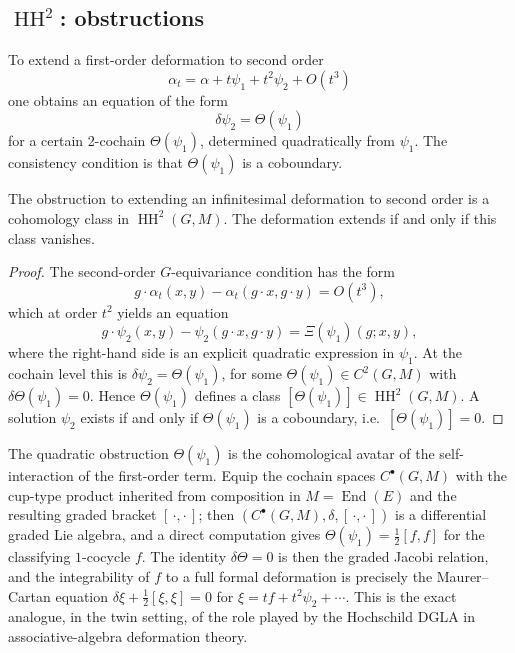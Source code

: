 \documentclass[11pt,a4paper]{article}
\numberwithin{equation}{section}
\DeclareMathOperator{\End}{End}
\DeclareMathOperator{\HH}{HH}
\newcommand{\Cochain}{C}
\newcommand{\diff}{\delta}
\begin{document}
	\subsection{$\HH^2$: obstructions}
	
	To extend a first-order deformation to second order
	\[
	\alpha_t=\alpha + t\psi_1 + t^2\psi_2 + O(t^3)
	\]
	one obtains an equation of the form
	\[
	\diff\psi_2 = \Theta(\psi_1)
	\]
	for a certain 2-cochain $\Theta(\psi_1)$, determined quadratically from $\psi_1$.
	The consistency condition is that $\Theta(\psi_1)$ is a coboundary.
	
	\begin{theorem}\label{thm:HH2-obstruction}
		The obstruction to extending an infinitesimal deformation to second order
		is a cohomology class in $\HH^2(G,M)$. The deformation extends
		if and only if this class vanishes.
	\end{theorem}
	
	\begin{proof}
		The second-order $G$-equivariance condition has the form
		\[
		g\cdot \alpha_t(x,y) - \alpha_t(g\cdot x,g\cdot y) = O(t^3),
		\]
		which at order $t^2$ yields an equation
		\[
		g\cdot \psi_2(x,y) - \psi_2(g\cdot x,g\cdot y) = \Xi(\psi_1)(g;x,y),
		\]
		where the right-hand side is an explicit quadratic expression in $\psi_1$.
		At the cochain level this is $\diff \psi_2 = \Theta(\psi_1)$, for some
		$\Theta(\psi_1)\in \Cochain^2(G,M)$ with $\diff\Theta(\psi_1)=0$.
		Hence $\Theta(\psi_1)$ defines a class $[\Theta(\psi_1)]\in \HH^2(G,M)$.
		A solution $\psi_2$ exists if and only if $\Theta(\psi_1)$ is a coboundary,
		i.e.\ $[\Theta(\psi_1)]=0$.
	\end{proof}
	
	\begin{remark}\label{rem:MC}
		The quadratic obstruction $\Theta(\psi_1)$ is the cohomological avatar of the self-interaction
		of the first-order term. Equip the cochain spaces $\Cochain^\bullet(G,M)$ with the cup-type product
		inherited from composition in $M=\End(E)$ and the resulting graded bracket $[\,\cdot,\cdot\,]$;
		then $(\Cochain^\bullet(G,M),\diff,[\,\cdot,\cdot\,])$ is a differential graded Lie algebra, and a
		direct computation gives $\Theta(\psi_1)=\tfrac12[f,f]$ for the classifying $1$-cocycle $f$. The
		identity $\diff\Theta=0$ is then the graded Jacobi relation, and the integrability of $f$ to a full
		formal deformation is precisely the Maurer--Cartan equation
		$\diff\xi+\tfrac12[\xi,\xi]=0$ for $\xi=tf+t^2\psi_2+\cdots$. This is the exact analogue, in the
		twin setting, of the role played by the Hochschild DGLA in associative-algebra deformation theory.
	\end{remark}
\end{document}
